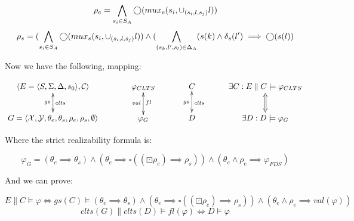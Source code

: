 \[ {\rho_e} = \bigwedge_{s_i \in S_A} \bigcirc(mux_e(s_i,\cup_{(s_i,l,s_j)}l))\]
\[ {\rho_s} = (\bigwedge_{s_i \in S_A} \bigcirc(mux_s(s_i,\cup_{(s_i,l,s_j)}l)) \wedge (\bigwedge_{(s_k,l',s_l) \in \Delta_A} (s(k) \wedge \delta_s(l') \implies \bigcirc(s(l))\]

Now we have the following, mapping:

\[\xymatrix@C+1pc{
	\langle E = \langle S, \Sigma, \Delta, s_0 \rangle, \mathcal{C} \rangle \ar@{<->}[d]^{clts}_{gs}
	& \varphi_{CLTS}\ar@{<->}[d]^{fl}_{val}
	& C\ar@{<->}[d]^{clts}_{gs}
	& \exists C: E\parallel C \models  \varphi_{CLTS}\ar@{<=>}[d]\\
	G = \langle \mathcal{X},\mathcal{Y},\theta_e,\theta_s,\rho_e,\rho_s, \emptyset \rangle
	& \varphi_G
	& D
	&\exists D: D \models \varphi_G\\
}\]

Where the strict realizability formula is:

\[\varphi_G = (\theta_e \implies \theta_s) \wedge (\theta_e \implies \square((\boxdot \rho_e) \implies \rho_s)) \wedge (\theta_e \wedge \rho_e \implies \varphi_{FDS}) \]

And we can prove:

\[E\parallel C \models  \varphi \iff gs(C) \models (\theta_e \implies \theta_s) \wedge (\theta_e \implies \square((\boxdot \rho_e) \implies \rho_s)) \wedge (\theta_e \wedge \rho_e \implies val(\varphi))
 \]
\[clts(G) \parallel clts(D) \models  fl(\varphi) \iff D \models \varphi \]